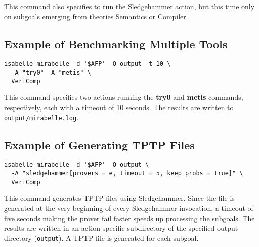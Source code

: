\documentclass[a4paper,12pt]{article}
\renewcommand\_{\hbox{\textunderscore\kern-.05ex}}
\begin{document}
This command also specifies to run the Sledgehammer action, but this time only
on subgoals emerging from theories Semantics or Compiler.


\subsection{Example of Benchmarking Multiple Tools}

\begin{verbatim}
isabelle mirabelle -d '$AFP' -O output -t 10 \
  -A "try0" -A "metis" \
  VeriComp
\end{verbatim}

This command specifies two actions running the \textbf{try0} and \textbf{metis}
commands, respectively, each with a timeout of 10 seconds. The results are
written to \texttt{output/mirabelle.log}.


\subsection{Example of Generating TPTP Files}

\begin{verbatim}
isabelle mirabelle -d '$AFP' -O output \
  -A "sledgehammer[provers = e, timeout = 5, keep_probs = true]" \
  VeriComp
\end{verbatim}

This command generates TPTP files using Sledgehammer. Since the file
is generated at the very beginning of every Sledgehammer invocation,
a timeout of five seconds making the prover fail faster speeds up
processing the subgoals. The results are written in an action-specific
subdirectory of the specified output directory (\texttt{output}). A TPTP
file is generated for each subgoal.

\let\em=\sl
{}

\end{document}
